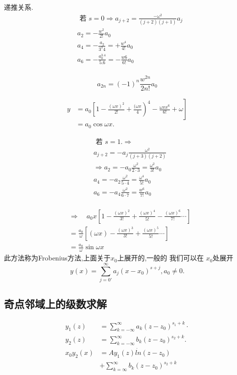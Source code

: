 递推关系.
$$
\begin{aligned}
& \text { 若 } s=0 \Rightarrow a_{j+2}=\frac{-\omega^2}{(j+2)(j+1)} a_j \\
& a_2=-\frac{w^2}{2 !} a_0 \\
& a_4=-\frac{a_2}{3^3 4}=+\frac{w^4}{4 !} a_0 \\
& a_6=-\frac{a_0^{3.4}}{5.6}=-\frac{w 6}{6 !} a_0 \\
&
\end{aligned}
$$

$$
a_{2 n}=(-1)^n \frac{w^{2 n}}{2 n !} a_0
$$

$$
\begin{aligned}
y & \left.=a_0\left[1-\frac{(\omega x)^2}{2 !}+\frac{(\omega x}{4}\right)^4-\frac{\omega x x^6}{6 !}+\omega\right] \\
& =a_0 \cos \omega x .
\end{aligned}
$$

$$
\begin{aligned}
& \text { 若 } s=1 . \Rightarrow \\
& a_{j+2}=-a_j \frac{\omega^2}{(j+3) (j+2)} \\
& \Rightarrow a_2=-a_0 \frac{\omega^2}{2 \cdot 3}=\frac{\omega^2}{3 !} a_0 \\
& a_4=-a_2 \frac{\omega^2}{5 \cdot 4}=\frac{\omega^4}{5 !} a_0 \\
& a_6=-a_4 \frac{\omega^2}{6\cdot 7}=\frac{w^6}{7 !} a_0 \\
\end{aligned}
$$

$$
\begin{aligned}
& \Rightarrow \quad a_0 x\left[1-\frac{(\omega x)^2}{3 !}+\frac{(\omega x)^{4}}{5 !}-\frac{(\omega x)^6}{7 !} \cdots\right] \\
& =\frac{a_0}{\omega}\left[(\omega x)-\frac{(\omega x)^3}{3 !}+\frac{(\omega x)^5}{5 !} \cdots\right] \\
& =\frac{a_0}{\omega} \sin \omega x
\end{aligned}
$$
此方法称为Frobenius方法,上面关于$x_0$上展开的,一般的
我们可以在 $x_0$处展开
$$
y(x)=\sum_{j=0'}^{\infty} a_j\left(x-x_0\right)^{s+j}, a_0 \neq 0 .
$$


\subsection{奇点邻域上的级数求解}
$$
\begin{aligned}
y_1(z) & =\sum_{k=-\infty}^{\infty} a_k\left(z-z_0\right)^{s_1+k} \cdot \\
y_2(z) & =\sum_{k=-\infty}^{\infty} b_k\left(z-z_0\right)^{s_2+k} . \\
x_0 y_2(x) & =A y_1(z) \dot{l n}\left(z-z_0\right) \\
& +\sum_{k=\infty}^{\infty} b_k\left(z-z_0\right)^{s_2+k}
\end{aligned}
$$



